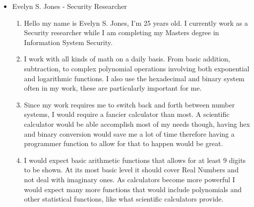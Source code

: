 \documentclass[titlepage]{article}
\begin{document}
\begin{itemize}
                    \item Evelyn S. Jones - Security Researcher
                        \begin{enumerate}
                            \item Hello my name is Evelyn S. Jones, I’m 25 years old. I currently work as a Security researcher while I am completing my Masters degree in Information System Security.
                            \item I work with all kinds of math on a daily basis. From basic addition, subtraction, to complex polynomial operations involving both exponential and logarithmic functions. I also use the hexadecimal and binary system often in my work, these are particularly important for me.
                            \item Since my work requires me to switch back and forth between number systems, I would require a fancier calculator than most. A scientific calculator would be able accomplish most of my needs though, having hex and binary conversion would save me a lot of time therefore having a programmer function to allow for that to happen would be great.
                            \item I would expect basic arithmetic functions that allows for at least 9 digits to be shown. At its most basic level it should cover Real Numbers and not deal with imaginary ones. As calculators become more powerful I would expect many more functions that would include polynomials and other statistical functions, like what scientific calculators provide.

\end{enumerate}
\end{itemize}
\end{document}
